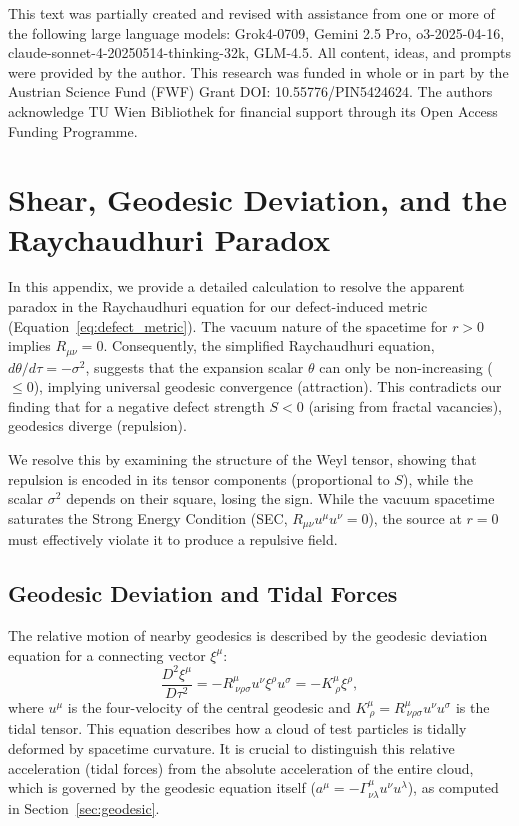 \documentclass[%
  reprint,
  superscriptaddress,
  showpacs,
  showkeys,
  amsmath,amssymb,
  pra,
  longbibliography,
  floatfix,
  x11names
]{revtex4-2}
\begin{document}
\begin{acknowledgments}
This text was partially created and revised with assistance from one or more of the following large language models: Grok4-0709, Gemini 2.5 Pro, o3-2025-04-16, claude-sonnet-4-20250514-thinking-32k, GLM-4.5. All content, ideas, and prompts were provided by the author.
This research was funded in whole or in part by the  Austrian Science Fund (FWF) Grant DOI: 10.55776/PIN5424624.
The authors acknowledge TU Wien Bibliothek for financial support through its Open Access Funding Programme.
\end{acknowledgments}



\appendix

\section{Shear, Geodesic Deviation, and the Raychaudhuri Paradox}
\label{app:shear}

In this appendix, we provide a detailed calculation to resolve the apparent paradox in the Raychaudhuri equation for our defect-induced metric (Equation~\ref{eq:defect_metric}). The vacuum nature of the spacetime for $r > 0$ implies $R_{\mu\nu} = 0$. Consequently, the simplified Raychaudhuri equation, $d\theta/d\tau = -\sigma^2$, suggests that the expansion scalar $\theta$ can only be non-increasing ($\leq 0$), implying universal geodesic convergence (attraction). This contradicts our finding that for a negative defect strength $S<0$ (arising from fractal vacancies), geodesics diverge (repulsion).

We resolve this by examining the structure of the Weyl tensor, showing that repulsion is encoded in its tensor components (proportional to $S$), while the scalar $\sigma^2$ depends on their square, losing the sign. While the vacuum spacetime saturates the Strong Energy Condition (SEC, $R_{\mu\nu} u^\mu u^\nu = 0$), the source at $r=0$ must effectively violate it to produce a repulsive field.

\subsection{Geodesic Deviation and Tidal Forces}
The relative motion of nearby geodesics is described by the geodesic deviation equation for a connecting vector $\xi^\mu$:
\begin{equation}
\frac{D^2 \xi^\mu}{D\tau^2} = - R^\mu_{\ \nu\rho\sigma} u^\nu \xi^\rho u^\sigma = -K^\mu_{\ \rho} \xi^\rho,
\label{eq:geodev}
\end{equation}
where $u^\mu$ is the four-velocity of the central geodesic and $K^\mu_{\ \rho} = R^\mu_{\ \nu\rho\sigma} u^\nu u^\sigma$ is the tidal tensor. This equation describes how a cloud of test particles is tidally deformed by spacetime curvature. It is crucial to distinguish this relative acceleration (tidal forces) from the absolute acceleration of the entire cloud, which is governed by the geodesic equation itself ($a^\mu = -\Gamma^\mu_{\nu\lambda} u^\nu u^\lambda$), as computed in Section~\ref{sec:geodesic}.
\end{document}
